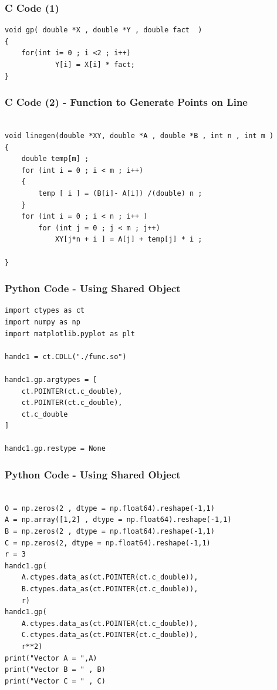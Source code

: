 \documentclass{beamer}
\begin{document}
\begin{frame}[fragile]
    \frametitle{C Code (1)}

    \begin{lstlisting}
void gp( double *X , double *Y , double fact  )
{
	for(int i= 0 ; i <2 ; i++)
			Y[i] = X[i] * fact;
}

\end{lstlisting}
\end{frame}

\begin{frame}[fragile]
    \frametitle{C Code (2) - Function to Generate Points on Line}
    \begin{lstlisting}
    
void linegen(double *XY, double *A , double *B , int n , int m )
{
    double temp[m] ; 
    for (int i = 0 ; i < m ; i++)
    {
        temp [ i ] = (B[i]- A[i]) /(double) n ; 
    }
    for (int i = 0 ; i < n ; i++ )
        for (int j = 0 ; j < m ; j++)
            XY[j*n + i ] = A[j] + temp[j] * i ; 
           
}

\end{lstlisting}
\end{frame}

\begin{frame}[fragile]
    \frametitle{Python Code - Using Shared Object}
    \begin{lstlisting}
import ctypes as ct
import numpy as np
import matplotlib.pyplot as plt

handc1 = ct.CDLL("./func.so")

handc1.gp.argtypes = [
    ct.POINTER(ct.c_double),
    ct.POINTER(ct.c_double),
    ct.c_double
]

handc1.gp.restype = None

\end{lstlisting}
\end{frame}

\begin{frame}[fragile]
    \frametitle{Python Code - Using Shared Object}
    \begin{lstlisting}

O = np.zeros(2 , dtype = np.float64).reshape(-1,1)
A = np.array([1,2] , dtype = np.float64).reshape(-1,1)
B = np.zeros(2 , dtype = np.float64).reshape(-1,1)
C = np.zeros(2, dtype = np.float64).reshape(-1,1)
r = 3 
handc1.gp(
    A.ctypes.data_as(ct.POINTER(ct.c_double)),
    B.ctypes.data_as(ct.POINTER(ct.c_double)),
    r)
handc1.gp(
    A.ctypes.data_as(ct.POINTER(ct.c_double)),
    C.ctypes.data_as(ct.POINTER(ct.c_double)),
    r**2)
print("Vector A = ",A)
print("Vector B = " , B)
print("Vector C = " , C)

\end{lstlisting}
\end{frame}
\end{document}
